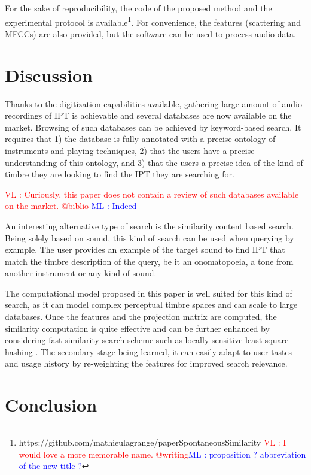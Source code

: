 \documentclass{article}
\newcommand{\ipt}{IPT\xspace}
\newcommand{\ml}[1]{\textcolor{blue}{ML : #1}}
\newcommand{\vl}[1]{\textcolor{red}{VL : #1}}
\begin{document}
For the sake of reproducibility, the code of the proposed method and the experimental protocol is available\footnote{https://github.com/mathieulagrange/paperSpontaneousSimilarity \vl{I would love a more memorable name. @writing}\ml{proposition ? abbreviation of the new title ?}}. For convenience, the features (scattering and MFCCs) are also provided, but the software can be used to process audio data.

\section{Discussion}\label{sec:discussion}

Thanks to the digitization capabilities available, gathering large amount of audio recordings of \ipt is achievable and several databases are now available on the market. Browsing of such databases can be achieved by keyword-based search. It requires that 1) the database is fully annotated with a precise ontology of instruments and playing techniques, 2) that the users have a precise understanding of this ontology, and 3) that the users a precise idea of the kind of timbre they are looking to find the \ipt they are searching for.

\vl{Curiously, this paper does not contain a review of such databases available on the market. @biblio}
\ml{Indeed}

An interesting alternative type of search is the similarity content based search. Being solely based on sound, this kind of search can be used when querying by example. The user provides an example of the target sound to find \ipt that match the timbre description of the query, be it an onomatopoeia, a tone from another instrument or any kind of sound.

The computational model proposed in this paper is well suited for this kind of search, as it can model complex perceptual timbre spaces and can scale to large databases. Once the features and the projection matrix are computed, the similarity computation is quite effective and can be further enhanced by considering fast similarity search scheme such as locally sensitive least square hashing \cite{pauleve2010locality}. The secondary stage being learned, it can easily adapt to user tastes and usage history by re-weighting the features for improved search relevance.

\section{Conclusion}
\end{document}
